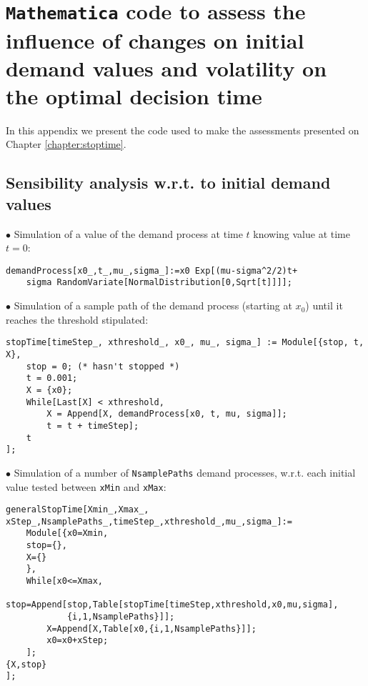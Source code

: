 
\chapter{\texttt{Mathematica} code to assess the influence of changes on initial demand values and volatility on the optimal decision time}
\label{chapter:appendixVectors}

In this appendix we present the code used to make the assessments presented on Chapter \ref{chapter:stoptime}.

\section{Sensibility analysis w.r.t. to initial demand values}
	\label{section:saidv}

 $\bullet$ Simulation of a value of the demand process at time $t$ knowing value at time $t=0$:
\begin{lstlisting}
demandProcess[x0_,t_,mu_,sigma_]:=x0 Exp[(mu-sigma^2/2)t+
	sigma RandomVariate[NormalDistribution[0,Sqrt[t]]]];
\end{lstlisting}

\vspace{3mm}
$\bullet$ Simulation of a sample path of the demand process (starting at $x_0$) until it reaches the threshold stipulated:
\begin{lstlisting}
stopTime[timeStep_, xthreshold_, x0_, mu_, sigma_] := Module[{stop, t, X},
	stop = 0; (* hasn't stopped *)
	t = 0.001;
	X = {x0};
	While[Last[X] < xthreshold,
		X = Append[X, demandProcess[x0, t, mu, sigma]];
		t = t + timeStep];
	t
];
\end{lstlisting}


\vspace{3mm}
$\bullet$ Simulation of a number of \texttt{NsamplePaths} demand processes, w.r.t. each initial value tested between \texttt{xMin} and \texttt{xMax}:
\begin{lstlisting}
generalStopTime[Xmin_,Xmax_, xStep_,NsamplePaths_,timeStep_,xthreshold_,mu_,sigma_]:=
	Module[{x0=Xmin,
	stop={},
	X={}
	},
	While[x0<=Xmax,
		stop=Append[stop,Table[stopTime[timeStep,xthreshold,x0,mu,sigma],
			{i,1,NsamplePaths}]];
		X=Append[X,Table[x0,{i,1,NsamplePaths}]];
		x0=x0+xStep;
	];
{X,stop}
];
\end{lstlisting}


